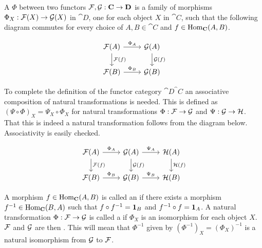 \documentclass[../../main.tex]{subfiles}
\begin{document}
    \begin{definition}
        A  $\Phi$ between two functors $\functor{F}, \functor{G}: \cat{C} \to \cat{D}$ is a family of morphisms $\Phi_X: \functor{F}(X) \to \functor{G}(X)$ in $\cat{D}$, one for each object $X$ in $\cat{C}$, such that the following diagram commutes for every choice of $A, B \in \cat{C}$ and $f \in \Hom_\cat{C}(A, B)$. 
    \end{definition}

    \begin{figure}[H]
        \[
            \begin{tikzcd}
                \functor{F}(A) \arrow[r, "\Phi_A"] \arrow[d, "\functor{F}(f)"]
                & \functor{G}(A) \arrow[d, "\functor{G}(f)"]\\
                \functor{F}(B) \arrow[r, "\Phi_B"]
                & \functor{G}(B)
            \end{tikzcd}
        \]
    \end{figure}

    To complete the definition of the functor category $\cat{D}^\cat{C}$ an associative composition of natural transformations is needed. This is defined as $(\Psi \circ \Phi)_X = \Psi_X \circ \Phi_X$ for natural transformations $\Phi: \functor{F} \to \functor{G}$ and $\Psi: \functor{G} \to \functor{H}$. That this is indeed a natural transformation follows from the diagram below. Associativity is easily checked.

    \begin{figure}[H]
        \[
            \begin{tikzcd}
                \functor{F}(A) \arrow[r, "\Phi_A"] \arrow[d, "\functor{F}(f)"]
                & \functor{G}(A) \arrow[r, "\Psi_A"] \arrow[d, "\functor{G}(f)"]
                & \functor{H}(A) \arrow[d, "\functor{H}(f)"]\\
                \functor{F}(B) \arrow[r, "\Phi_B"]
                & \functor{G}(B) \arrow[r, "\Psi_B"]
                & \functor{H}(B)
            \end{tikzcd}
        \]
    \end{figure}

    A morphism $f \in \Hom_\cat{C}(A, B)$ is called an  if there exists a morphism $f^{-1} \in \Hom_\cat{C}(B,A)$ such that $f \circ f^{-1} = \idarrow[B]$ and $f^{-1} \circ f = \idarrow[A]$. A natural transformation $\Phi: \functor{F} \to \functor{G}$ is called a  if $\Phi_X$ is an isomorphism for each object $X$. $\functor{F}$ and $\functor{G}$ are then . This will mean that $\Phi^{-1}$ given by $(\Phi^{-1})_X = (\Phi_X)^{-1}$ is a natural isomorphism from $\functor{G}$ to $\functor{F}$.
    
\end{document}
